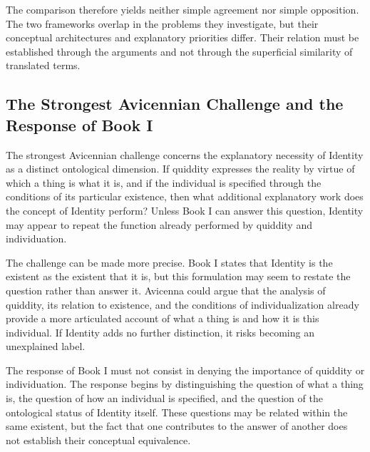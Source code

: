 \label{para:VS.B01.P01.C08.S13.SS14.P005}

The comparison
therefore yields
neither simple
agreement nor
simple opposition.
The two
frameworks overlap
in the problems
they investigate,
but their
conceptual
architectures
and explanatory
priorities differ.
Their relation
must be established
through the
arguments and
not through
the superficial
similarity of
translated terms.



\subsection{The Strongest Avicennian Challenge and the Response of Book I}
\label{subsec:ch08-avicenna-strongest-challenge}

\label{para:VS.B01.P01.C08.S13.SS15.P001}

The strongest Avicennian
challenge concerns
the explanatory
necessity of
Identity as
a distinct
ontological dimension.
If quiddity
expresses the
reality by
virtue of which
a thing is
what it is,
and if the
individual is
specified through
the conditions
of its particular
existence,
then what
additional
explanatory work
does the
concept of
Identity perform?
Unless Book I
can answer
this question,
Identity may
appear to
repeat the
function already
performed by
quiddity and
individuation.

\label{para:VS.B01.P01.C08.S13.SS15.P002}

The challenge
can be made
more precise.
Book I states
that Identity
is the existent
as the existent
that it is,
but this
formulation may
seem to
restate the
question rather
than answer it.
Avicenna could
argue that
the analysis
of quiddity,
its relation
to existence,
and the
conditions of
individualization
already provide
a more articulated
account of
what a thing
is and
how it
is this
individual. If
Identity adds
no further
distinction,
it risks
becoming an
unexplained
label.

\label{para:VS.B01.P01.C08.S13.SS15.P003}

The response
of Book I
must not
consist in
denying the
importance of
quiddity or
individuation.
The response
begins by
distinguishing
the question
of what
a thing is,
the question
of how
an individual
is specified,
and the
question of
the ontological
status of
Identity itself.
These questions
may be related
within the
same existent,
but the
fact that
one contributes
to the
answer of
another does
not establish
their conceptual
equivalence.

